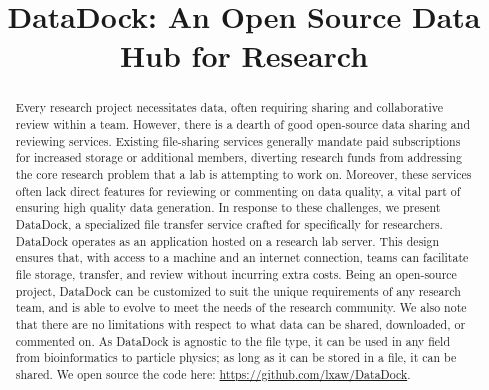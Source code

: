 \documentclass[conference]{IEEEtran}
\begin{document}
\title{
    DataDock: An Open Source Data Hub for Research
}

\author{
\and
{}
}

\maketitle

\begin{abstract}
Every research project necessitates data, often requiring sharing and collaborative review within a team. 
However, there is a dearth of good open-source data sharing and reviewing services. Existing file-sharing services generally mandate paid subscriptions for increased storage or additional members, 
diverting research funds from addressing the core research problem that a lab is attempting to work on. 
Moreover, these services often lack direct features for reviewing or 
commenting on data quality, a vital part of ensuring high quality data generation. 
In response to these challenges, we present DataDock, a specialized file transfer service crafted for specifically for researchers. 
DataDock operates as an application hosted on a research lab server. This design ensures that, with access to a machine and an internet connection, 
teams can facilitate file storage, transfer, and review without incurring extra costs. Being an open-source project, DataDock can be customized to 
suit the unique requirements of any research team, and is able to evolve to meet the needs of the research community. We also note that there are no 
limitations with respect to what data can be shared, downloaded, or commented on. As DataDock is agnostic to the file type, it can be used in any field from 
bioinformatics to particle physics; as long as it can be stored in a file, it can be shared.
We open source the code here: 
\href{https://github.com/lxaw/DataDock}{https://github.com/lxaw/DataDock}.

\end{abstract}
\end{document}
